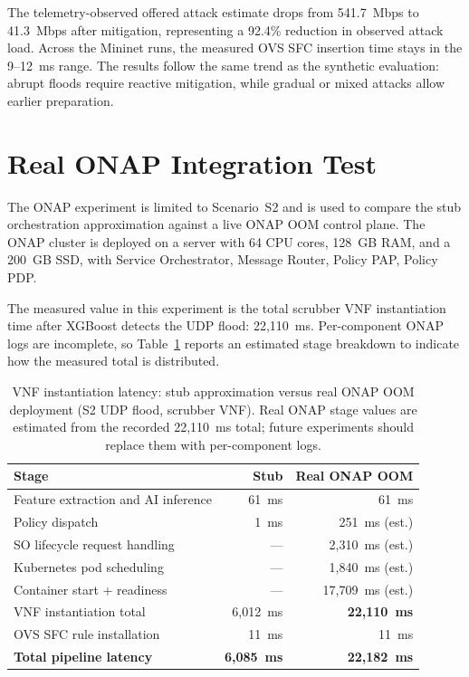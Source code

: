 The telemetry-observed offered attack estimate drops from 541.7~Mbps to 41.3~Mbps after mitigation, representing a 92.4\% reduction in observed attack load. Across the Mininet runs, the measured OVS SFC insertion time stays in the 9--12~ms range. The results follow the same trend as the synthetic evaluation: abrupt floods require reactive mitigation, while gradual or mixed attacks allow earlier  preparation.

\section{Real ONAP Integration Test}
\label{sec:onap-real}

The ONAP experiment is limited to Scenario~S2 and is used to compare the stub orchestration approximation against a live ONAP OOM control plane. The ONAP cluster is deployed on a server with 64 CPU cores, 128~GB RAM, and a 200~GB SSD, with Service Orchestrator, Message Router, Policy PAP, Policy PDP.

The measured value in this experiment is the total scrubber VNF instantiation time after XGBoost detects the UDP flood: 22{,}110~ms. Per-component ONAP logs are incomplete, so Table~\ref{tab:onap-real-vs-stub} reports an estimated stage breakdown to indicate how the measured total is distributed.

\begin{table}[H]
\centering
\small
\caption{VNF instantiation latency: stub approximation versus real
ONAP OOM deployment (S2 UDP flood, scrubber VNF). Real ONAP stage values are estimated from the recorded 22{,}110~ms total; future experiments should replace them with per-component logs.}
\label{tab:onap-real-vs-stub}
\begin{tabular}{@{}lrr@{}}
\toprule
Stage & Stub & Real ONAP OOM \\
\midrule
Feature extraction and AI inference & 61~ms   & 61~ms \\
Policy dispatch      & 1~ms    & 251~ms (est.) \\
SO lifecycle request handling       & ---     & 2{,}310~ms (est.) \\
Kubernetes pod scheduling           & ---     & 1{,}840~ms (est.) \\
Container start + readiness         & ---     & 17{,}709~ms (est.) \\
VNF instantiation total             & 6{,}012~ms & \textbf{22{,}110~ms} \\
OVS SFC rule installation           & 11~ms   & 11~ms \\
\midrule
\textbf{Total pipeline latency}     & \textbf{6{,}085~ms} & \textbf{22{,}182~ms} \\
\bottomrule
\end{tabular}
\end{table}

